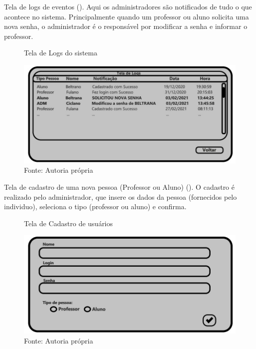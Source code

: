 \documentclass{utfpr-pg}
\begin{document}
    Tela de logs de eventos (). Aqui os administradores são notificados de tudo o que acontece no sistema. Principalmente quando um professor ou aluno solicita uma nova senha, o administrador é o responsável por modificar a senha e informar o professor.
    \begin{figure}[H]
            \centering
            \captionsetup{width=0.9\textwidth}
            \caption{Tela de Logs do sistema}
            \includegraphics[width=\linewidth]{fotos/12.jpg}
            \caption*{Fonte: Autoria própria}
            \label{fig:12}
        \end{figure}
        
        Tela de cadastro de uma nova pessoa (Professor ou Aluno) (). O cadastro é realizado pelo administrador, que insere os dados da pessoa (fornecidos pelo individuo), seleciona o tipo (professor ou aluno) e confirma.
        \begin{figure}[H]
            \centering
            \captionsetup{width=0.9\textwidth}
            \caption{Tela de Cadastro de usuários}
            \includegraphics[width=\linewidth]{fotos/13.jpg}
            \caption*{Fonte: Autoria própria}
            \label{fig:13}
        \end{figure}
        
\end{document}
